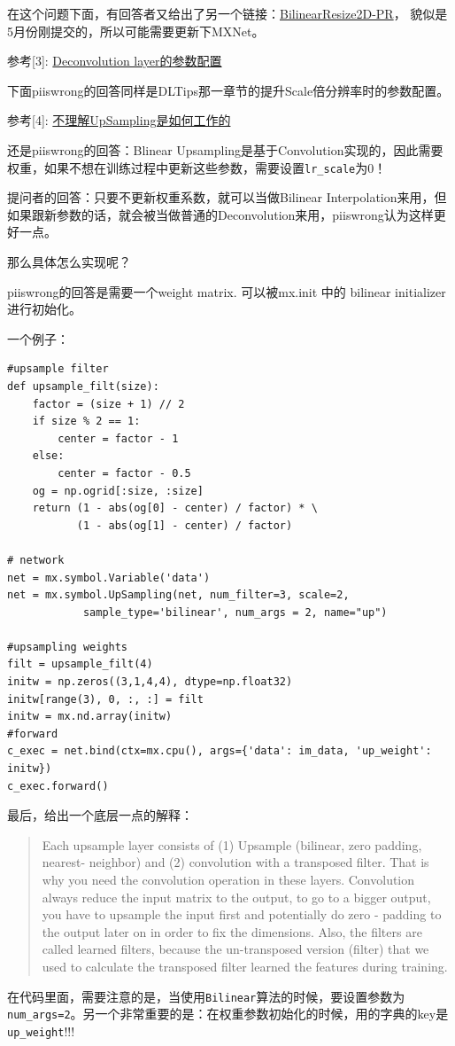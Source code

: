 在这个问题下面，有回答者又给出了另一个链接：\href{https://github.com/apache/incubator-mxnet/pull/9688}{BilinearResize2D-PR}， 貌似是5月份刚提交的，所以可能需要更新下MXNet。

参考[3]: \href{https://github.com/apache/incubator-mxnet/issues/1514}{Deconvolution layer的参数配置}

下面piiswrong的回答同样是DLTips那一章节的提升Scale倍分辨率时的参数配置。

参考[4]: \href{https://github.com/apache/incubator-mxnet/issues/1412}{不理解UpSampling是如何工作的}

还是piiswrong的回答：Blinear Upsampling是基于Convolution实现的，因此需要权重，如果不想在训练过程中更新这些参数，需要设置\verb|lr_scale|为0！

提问者的回答：只要不更新权重系数，就可以当做Bilinear Interpolation来用，但如果跟新参数的话，就会被当做普通的Deconvolution来用，piiswrong认为这样更好一点。

那么具体怎么实现呢？

piiswrong的回答是需要一个weight matrix. 可以被mx.init 中的 bilinear initializer进行初始化。

一个例子：

\begin{lstlisting}
#upsample filter
def upsample_filt(size):
    factor = (size + 1) // 2
    if size % 2 == 1:
        center = factor - 1
    else:
        center = factor - 0.5
    og = np.ogrid[:size, :size]
    return (1 - abs(og[0] - center) / factor) * \
           (1 - abs(og[1] - center) / factor)

# network
net = mx.symbol.Variable('data')
net = mx.symbol.UpSampling(net, num_filter=3, scale=2, 
			sample_type='bilinear', num_args = 2, name="up")

#upsampling weights
filt = upsample_filt(4)
initw = np.zeros((3,1,4,4), dtype=np.float32)
initw[range(3), 0, :, :] = filt
initw = mx.nd.array(initw)
#forward
c_exec = net.bind(ctx=mx.cpu(), args={'data': im_data, 'up_weight': initw})
c_exec.forward()
\end{lstlisting}

最后，给出一个底层一点的解释：
\begin{quote}
Each upsample layer consists of (1) Upsample (bilinear, zero padding, nearest- neighbor) and (2) convolution with a transposed filter. That is why you need the convolution operation in these layers. Convolution always reduce the input matrix to the output, to go to a bigger output, you have to upsample the input first and potentially do zero - padding to the output later on in order to fix the dimensions. Also, the filters are called learned filters, because the un-transposed version (filter) that we used to calculate the transposed filter learned the features during training.
\end{quote}
在代码里面，需要注意的是，当使用\verb|Bilinear|算法的时候，要设置参数为\verb|num_args=2|。另一个非常重要的是：在权重参数初始化的时候，用的字典的key是\verb|up_weight|!!!

